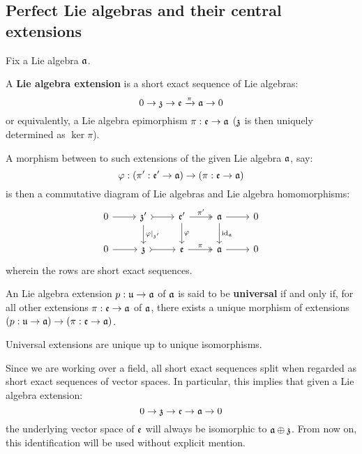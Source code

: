     \subsection{Perfect Lie algebras and their central extensions}
        \begin{definition} \label{def: lie_algebra_extensions}
            Fix a Lie algebra $\mathfrak{a}$.
        
            A \textbf{Lie algebra extension} is a short exact sequence of Lie algebras:
                $$0 \to \mathfrak{z} \to \mathfrak{e} \xrightarrow[]{\pi} \mathfrak{a} \to 0$$
            or equivalently, a Lie algebra epimorphism $\pi: \mathfrak{e} \to \mathfrak{a}$ ($\mathfrak{z}$ is then uniquely determined as $\ker \pi$). 
            
            A morphism between to such extensions of the given Lie algebra $\mathfrak{a}$, say:
                $$\varphi: (\pi': \mathfrak{e}' \to \mathfrak{a}) \to (\pi: \mathfrak{e} \to \mathfrak{a})$$
            is then a commutative diagram of Lie algebras and Lie algebra homomorphisms:
                $$
                    \begin{tikzcd}
                	0 & {\z'} & {\frake'} & \a & 0 \\
                	0 & \z & \frake & \a & 0
                	\arrow["{\varphi|_{\z'}}", from=1-2, to=2-2]
                	\arrow["\varphi", from=1-3, to=2-3]
                	\arrow["{\id_{\a}}", from=1-4, to=2-4]
                	\arrow[from=1-1, to=1-2]
                	\arrow[tail, from=1-2, to=1-3]
                	\arrow["{\pi'}", two heads, from=1-3, to=1-4]
                	\arrow[from=1-4, to=1-5]
                	\arrow[from=2-1, to=2-2]
                	\arrow[tail, from=2-2, to=2-3]
                	\arrow["\pi", two heads, from=2-3, to=2-4]
                	\arrow[from=2-4, to=2-5]
                    \end{tikzcd}
                $$
            wherein the rows are short exact sequences.

            An Lie algebra extension $p: \mathfrak{u} \to \mathfrak{a}$ of $\mathfrak{a}$ is said to be \textbf{universal} if and only if, for all other extensions $\pi: \mathfrak{e} \to \mathfrak{a}$ of $\mathfrak{a}$, there exists a unique morphism of extensions $(p: \mathfrak{u} \to \mathfrak{a}) \to (\pi: \mathfrak{e} \to \mathfrak{a})$.
        \end{definition}
        \begin{remark}
            Universal extensions are unique up to unique isomorphisms. 
        \end{remark}
        \begin{remark}
            Since we are working over a field, all short exact sequences split when regarded as short exact sequences of vector spaces. In particular, this implies that given a Lie algebra extension:
                $$0 \to \mathfrak{z} \to \mathfrak{e} \to \mathfrak{a} \to 0$$
            the underlying vector space of $\mathfrak{e}$ will always be isomorphic to $\mathfrak{a} \oplus \mathfrak{z}$. From now on, this identification will be used without explicit mention.
        \end{remark}
